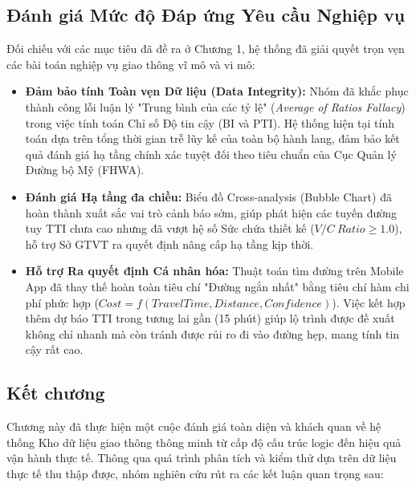 \subsection{Đánh giá Mức độ Đáp ứng Yêu cầu Nghiệp vụ}

Đối chiếu với các mục tiêu đã đề ra ở Chương 1, hệ thống đã giải quyết trọn vẹn các bài toán nghiệp vụ giao thông vĩ mô và vi mô:

\begin{itemize}
    \item \textbf{Đảm bảo tính Toàn vẹn Dữ liệu (Data Integrity):} Nhóm đã khắc phục thành công lỗi luận lý "Trung bình của các tỷ lệ" (\textit{Average of Ratios Fallacy}) trong việc tính toán Chỉ số Độ tin cậy (BI và PTI). Hệ thống hiện tại tính toán dựa trên tổng thời gian trễ lũy kế của toàn bộ hành lang, đảm bảo kết quả đánh giá hạ tầng chính xác tuyệt đối theo tiêu chuẩn của Cục Quản lý Đường bộ Mỹ (FHWA).
    \item \textbf{Đánh giá Hạ tầng đa chiều:} Biểu đồ Cross-analysis (Bubble Chart) đã hoàn thành xuất sắc vai trò cảnh báo sớm, giúp phát hiện các tuyến đường tuy TTI chưa cao nhưng đã vượt hệ số Sức chứa thiết kế ($V/C \ Ratio \ge 1.0$), hỗ trợ Sở GTVT ra quyết định nâng cấp hạ tầng kịp thời.
    \item \textbf{Hỗ trợ Ra quyết định Cá nhân hóa:} Thuật toán tìm đường trên Mobile App đã thay thế hoàn toàn tiêu chí "Đường ngắn nhất" bằng tiêu chí hàm chi phí phức hợp ($Cost = f(TravelTime, Distance, Confidence)$). Việc kết hợp thêm dự báo TTI trong tương lai gần (15 phút) giúp lộ trình được đề xuất không chỉ nhanh mà còn tránh được rủi ro đi vào đường hẹp, mang tính tin cậy rất cao.
\end{itemize}

\subsection{Kết chương }

Chương này đã thực hiện một cuộc đánh giá toàn diện và khách quan về hệ thống Kho dữ liệu giao thông thông minh từ cấp độ cấu trúc logic đến hiệu quả vận hành thực tế. Thông qua quá trình phân tích và kiểm thử dựa trên dữ liệu thực tế thu thập được, nhóm nghiên cứu rút ra các kết luận quan trọng sau:

